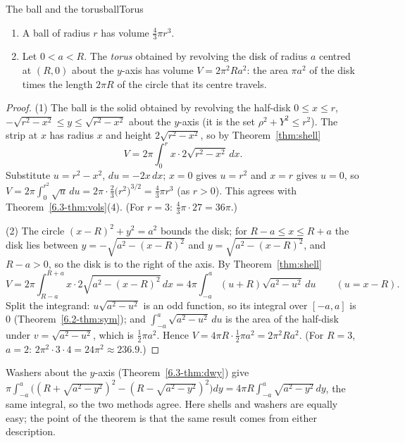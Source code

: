 \documentclass[11pt]{article}
\begin{document}
\begin{thm}{The ball and the torus}{ballTorus}
\begin{enumerate}[label=(\arabic*),nosep]
  \item A ball of radius $r$ has volume $\frac43\pi r^3$.
  \item Let $0<a<R$. The \emph{torus} obtained by revolving the disk of radius $a$ centred at $(R,0)$ about the $y$-axis has volume $V=2\pi^2Ra^2$: the area $\pi a^2$ of the disk times the length $2\pi R$ of the circle that its centre travels.
\end{enumerate}
\end{thm}
\begin{proof}
(1) The ball is the solid obtained by revolving the half-disk $0\le x\le r$, $-\sqrt{r^2-x^2}\le y\le\sqrt{r^2-x^2}$ about the $y$-axis (it is the set $\rho^2+Y^2\le r^2$). The strip at $x$ has radius $x$ and height $2\sqrt{r^2-x^2}$, so by Theorem~\ref{thm:shell}
\[
V=2\pi\int_0^rx\cdot2\sqrt{r^2-x^2}\,dx .
\]
Substitute $u=r^2-x^2$, $du=-2x\,dx$; $x=0$ gives $u=r^2$ and $x=r$ gives $u=0$, so $V=2\pi\int_0^{r^2}\sqrt u\,du=2\pi\cdot\frac23\bigl(r^2\bigr)^{3/2}=\frac43\pi r^3$ (as $r>0$). This agrees with Theorem~\ref{6.3-thm:vols}(4). (For $r=3$: $\frac43\pi\cdot27=36\pi$.)

(2) The circle $(x-R)^2+y^2=a^2$ bounds the disk; for $R-a\le x\le R+a$ the disk lies between $y=-\sqrt{a^2-(x-R)^2}$ and $y=\sqrt{a^2-(x-R)^2}$, and $R-a>0$, so the disk is to the right of the axis. By Theorem~\ref{thm:shell}
\[
V=2\pi\int_{R-a}^{R+a}x\cdot2\sqrt{a^2-(x-R)^2}\,dx=4\pi\int_{-a}^{a}(u+R)\sqrt{a^2-u^2}\,du\qquad(u=x-R).
\]
Split the integrand: $u\sqrt{a^2-u^2}$ is an odd function, so its integral over $[-a,a]$ is $0$ (Theorem~\ref{6.2-thm:sym}); and $\int_{-a}^a\sqrt{a^2-u^2}\,du$ is the area of the half-disk under $v=\sqrt{a^2-u^2}$, which is $\frac12\pi a^2$. Hence $V=4\pi R\cdot\frac12\pi a^2=2\pi^2Ra^2$. (For $R=3$, $a=2$: $2\pi^2\cdot3\cdot4=24\pi^2\approx236.9$.)
\end{proof}

\begin{remark}
Washers about the $y$-axis (Theorem~\ref{6.3-thm:dwy}) give $\pi\int_{-a}^a\bigl((R+\sqrt{a^2-y^2})^2-(R-\sqrt{a^2-y^2})^2\bigr)dy=4\pi R\int_{-a}^a\sqrt{a^2-y^2}\,dy$, the same integral, so the two methods agree. Here shells and washers are equally easy; the point of the theorem is that the same result comes from either description.
\end{remark}
\end{document}
